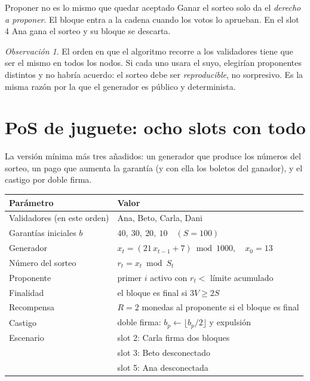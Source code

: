 \documentclass[11pt,a4paper]{article}
\theoremstyle{definition}
\theoremstyle{plain}
\theoremstyle{remark}
\newtheorem*{observacion}{Observación}
\begin{document}
\begin{aviso}{Proponer no es lo mismo que quedar aceptado}
Ganar el sorteo solo da el \emph{derecho a proponer}. El bloque entra a la cadena
cuando los votos lo aprueban. En el slot 4 Ana gana el sorteo y su bloque se
descarta.
\end{aviso}

\begin{observacion}
El orden en que el algoritmo recorre a los validadores tiene que ser el mismo en
todos los nodos. Si cada uno usara el suyo, elegirían proponentes distintos y no
habría acuerdo: el sorteo debe ser \emph{reproducible}, no sorpresivo. Es la
misma razón por la que el generador es público y determinista.
\end{observacion}

\section{PoS de juguete: ocho slots con todo}\label{sec:juguete}

La versión mínima más tres añadidos: un generador que produce los números del
sorteo, un pago que aumenta la garantía (y con ella los boletos del ganador), y
el castigo por doble firma.

\begin{center}
\small
\begin{tabular}{@{}ll@{}}
\toprule
Parámetro & Valor \\
\midrule
Validadores (en este orden) & Ana, Beto, Carla, Dani \\
Garantías iniciales $b$     & $40,\ 30,\ 20,\ 10 \quad (S = 100)$ \\
Generador                   & $x_t = (21\,x_{t-1} + 7) \bmod 1000,\quad x_0 = 13$ \\
Número del sorteo           & $r_t = x_t \bmod S_t$ \\
Proponente                  & primer $i$ activo con $r_t <$ límite acumulado \\
Finalidad                   & el bloque es final si $3V \ge 2S$ \\
Recompensa                  & $R = 2$ monedas al proponente si el bloque es final \\
Castigo                     & doble firma: $b_p \leftarrow \lfloor b_p/2 \rfloor$ y expulsión \\
Escenario                   & slot 2: Carla firma dos bloques \\
                            & slot 3: Beto desconectado \\
                            & slot 5: Ana desconectada \\
\bottomrule
\end{tabular}
\end{center}
\end{document}
